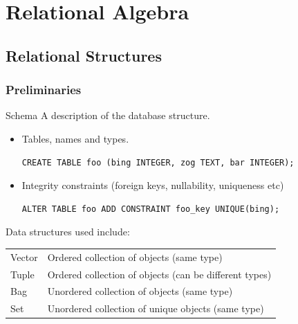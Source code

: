 \chapter{Relational Algebra}

\section{Relational Structures}

\subsection{Preliminaries}
\begin{definitionbox}{Schema}
    A description of the database structure.
    \begin{itemize}
        \item {Tables, names and types.
            \begin{verbatim}
CREATE TABLE foo (bing INTEGER, zog TEXT, bar INTEGER); 
            \end{verbatim}
        }
        \item {Integrity constraints (foreign keys, nullability, uniqueness etc)
                \begin{verbatim}
ALTER TABLE foo ADD CONSTRAINT foo_key UNIQUE(bing);
                \end{verbatim}
        }
    \end{itemize}
\end{definitionbox}

Data structures used include:
\begin{center}
    \begin{tabular}{l p{}}
        Vector & Ordered collection of objects (same type) \\
        Tuple & Ordered collection of objects (can be different types) \\
        Bag & Unordered collection of objects (same type) \\
        Set & Unordered collection of unique objects (same type) \\
    \end{tabular}
\end{center}

